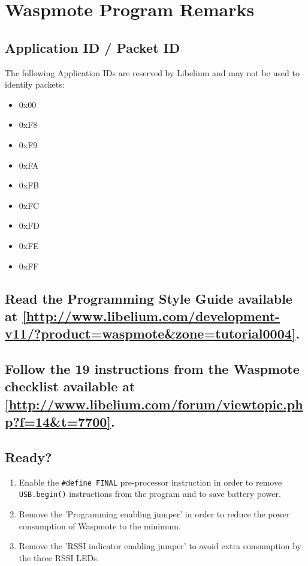 \section{Waspmote Program Remarks}
\label{AppendixG}
\subsection{Application ID / Packet ID}
The following Application IDs are reserved by Libelium and may not be used to identify packets:
\begin{itemize}
\item 0x00\\
\item 0xF8\\
\item 0xF9\\
\item 0xFA\\
\item 0xFB\\
\item 0xFC\\
\item 0xFD\\
\item 0xFE\\
\item 0xFF\\
\end{itemize}
\subsection{Read the Programming Style Guide available at \ref{http://www.libelium.com/development-v11/?product=waspmote&zone=tutorial0004}. }
\subsection{Follow the 19 instructions from the Waspmote checklist available at \ref{http://www.libelium.com/forum/viewtopic.php?f=14&t=7700}. }
\subsection{Ready?}
\begin{enumerate}
\item Enable the \verb+#define FINAL+ pre-processor instruction in order to remove \verb+USB.begin()+ instructions from the program and to save battery power.
\item  Remove the 'Programming enabling jumper' in order to reduce the power consumption of Waspmote to the minimum.
\item Remove the 'RSSI indicator enabling jumper' to avoid extra consumption by the three RSSI LEDs.
\end{enumerate}

